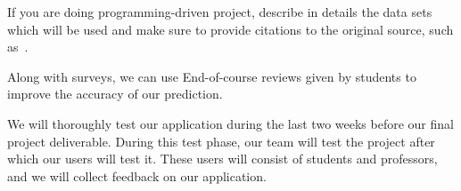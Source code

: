 \documentclass{article}
\begin{document}
If you are doing programming-driven project, describe in details the data sets which will be used and make sure to provide citations to the original source, such as~\cite{knuthwebsite}. 

Along with surveys, we can use End-of-course reviews given by students to improve the accuracy of our prediction.

We will thoroughly test our application during the last two weeks before our final project deliverable. During this test phase, our team will test the project after which our users will test it. These users will consist of students and professors, and we will collect feedback on our application. 

 

\end{document}

